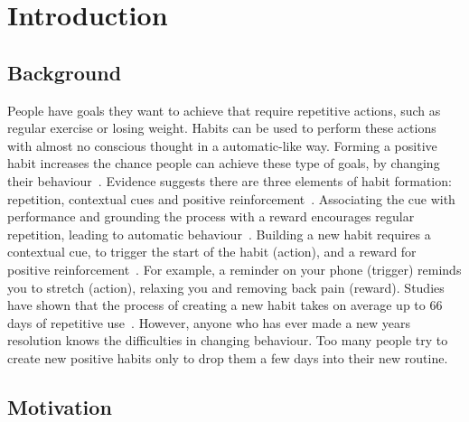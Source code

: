 
\section{Introduction}

\subsection*{Background}
People have goals they want to achieve that require repetitive actions, such as regular exercise or losing weight. Habits can be used to perform these actions with almost no conscious thought in a automatic-like way. Forming a positive habit increases the chance people can achieve these type of goals, by changing their behaviour~\cite{article_promoting_habit_formation}. Evidence suggests there are three elements of habit formation: repetition, contextual cues and positive reinforcement~\cite{article_beyond_self_tracking_designing_apps}. Associating the cue with performance and grounding the process with a reward encourages regular repetition, leading to automatic behaviour~\cite{article_experiences_of_habit_formation}. Building a new habit requires a contextual cue, to trigger the start of the habit (action), and a reward for positive reinforcement~\cite{article_beyond_self_tracking_designing_apps, article_how_habits_formed_modelling_habit_formation}. For example, a reminder on your phone (trigger) reminds you to stretch (action), relaxing you and removing back pain (reward). Studies have shown that the process of creating a new habit takes on average up to 66 days of repetitive use~\cite{article_how_habits_formed_modelling_habit_formation}. However, anyone who has ever made a new years resolution knows the difficulties in changing behaviour. Too many people try to create new positive habits only to drop them a few days into their new routine.

\subsection*{Motivation}

